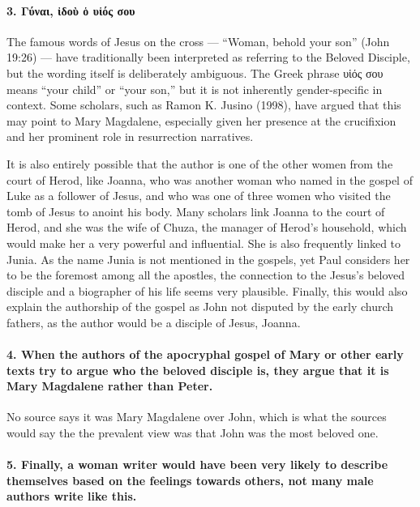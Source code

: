 \paragraph{3.
Γύναι, ἰδοὺ ὁ υἱός σου}\label{par:ux3b3ux3cdux3bdux3b1ux3b9-ux1f30ux3b4ux3bfux1f7a-ux1f41-ux3c5ux1f31ux3ccux3c2-ux3c3ux3bfux3c5}

The famous words of Jesus on the cross --- ``Woman, behold your son'' (John 19:26) --- have traditionally been interpreted as referring to the Beloved Disciple, but the wording itself is deliberately ambiguous.
The Greek phrase υἱός σου means ``your child'' or ``your son,'' but it is not inherently gender-specific in context.
Some scholars, such as Ramon K.
Jusino (1998), have argued that this may point to Mary Magdalene, especially given her presence at the crucifixion and her prominent role in resurrection narratives.

It is also entirely possible that the author is one of the other women from the court of Herod, like Joanna, who was another woman who named in the gospel of Luke as a follower of Jesus, and who was one of three women who visited the tomb of Jesus to anoint his body.
Many scholars link Joanna to the court of Herod, and she was the wife of Chuza, the manager of Herod's household, which would make her a very powerful and influential.
She is also frequently linked to Junia.
As the name Junia is not mentioned in the gospels, yet Paul considers her to be the foremost among all the apostles, the connection to the Jesus's beloved disciple and a biographer of his life seems very plausible.
Finally, this would also explain the authorship of the gospel as John not disputed by the early church fathers, as the author would be a disciple of Jesus, Joanna.

\paragraph{4.
When the authors of the apocryphal gospel of Mary or other early texts try to argue who the beloved disciple is, they argue that it is Mary Magdalene rather than Peter.}\label{par:when-the-authors-of-the-apocryphal-gospel-of-mary-or-other-early-texts-try-to-argue-who-the-beloved-disciple-is-they-argue-that-it-is-mary-magdalene-rather-than-peter.}

No source says it was Mary Magdalene over John, which is what the sources would say the the prevalent view was that John was the most beloved one.

\paragraph{5.
Finally, a woman writer would have been very likely to describe themselves based on the feelings towards others, not many male authors write like this.}\label{par:finally-a-woman-writer-would-have-been-very-likely-to-describe-themselves-based-on-the-feelings-towards-others-not-many-male-authors-write-like-this.}

